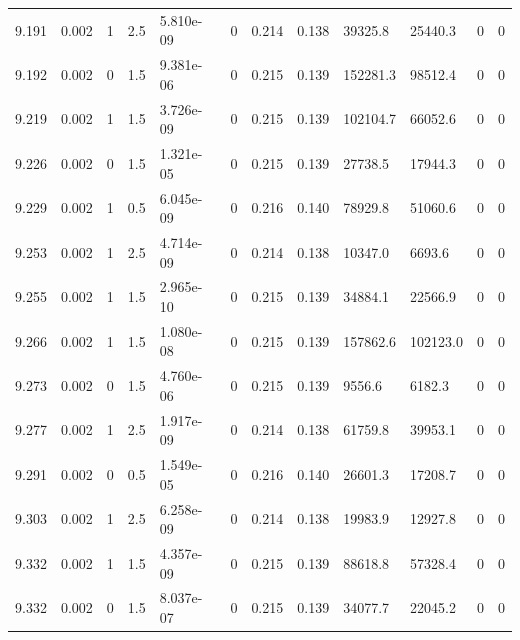 \documentclass[preview]{standalone}
\begin{document}
{{{{{{{{{{{{{{{{\begin{tabular}{L{1.2cm}C{1.2cm} C{0.3cm}C{0.5cm} C{1.4cm}C{1.4cm} C{1.4cm}C{1.4cm} C{1.6cm}C{1.6cm} C{1.6cm}C{1.6cm}}
  9.191  &  0.002  & 1     & 2.5 &  5.810e-09  & 0  &  0.214&   0.138& 39325.8 & 25440.3   &  0 & 0  \\ 
  9.192  &  0.002  & 0     & 1.5 &  9.381e-06  & 0  &  0.215&   0.139& 152281.3 & 98512.4   &  0 & 0  \\ 
  9.219  &  0.002  & 1     & 1.5 &  3.726e-09  & 0  &  0.215&   0.139& 102104.7 & 66052.6   &  0 & 0  \\ 
  9.226  &  0.002  & 0     & 1.5 &  1.321e-05  & 0  &  0.215&   0.139& 27738.5 & 17944.3   &  0 & 0  \\ 
  9.229  &  0.002  & 1     & 0.5 &  6.045e-09  & 0  &  0.216&   0.140& 78929.8 & 51060.6   &  0 & 0  \\ 
  9.253  &  0.002  & 1     & 2.5 &  4.714e-09  & 0  &  0.214&   0.138& 10347.0 & 6693.6   &  0 & 0  \\ 
  9.255  &  0.002  & 1     & 1.5 &  2.965e-10  & 0  &  0.215&   0.139& 34884.1 & 22566.9   &  0 & 0  \\ 
  9.266  &  0.002  & 1     & 1.5 &  1.080e-08  & 0  &  0.215&   0.139& 157862.6 & 102123.0   &  0 & 0  \\ 
  9.273  &  0.002  & 0     & 1.5 &  4.760e-06  & 0  &  0.215&   0.139& 9556.6 & 6182.3   &  0 & 0  \\ 
  9.277  &  0.002  & 1     & 2.5 &  1.917e-09  & 0  &  0.214&   0.138& 61759.8 & 39953.1   &  0 & 0  \\ 
  9.291  &  0.002  & 0     & 0.5 &  1.549e-05  & 0  &  0.216&   0.140& 26601.3 & 17208.7   &  0 & 0  \\ 
  9.303  &  0.002  & 1     & 2.5 &  6.258e-09  & 0  &  0.214&   0.138& 19983.9 & 12927.8   &  0 & 0  \\ 
  9.332  &  0.002  & 1     & 1.5 &  4.357e-09  & 0  &  0.215&   0.139& 88618.8 & 57328.4   &  0 & 0  \\ 
  9.332  &  0.002  & 0     & 1.5 &  8.037e-07  & 0  &  0.215&   0.139& 34077.7 & 22045.2   &  0 & 0  \\ 
\hline 
\end{tabular} 

}}}}}}}}}}}}}}}}
\end{document}
